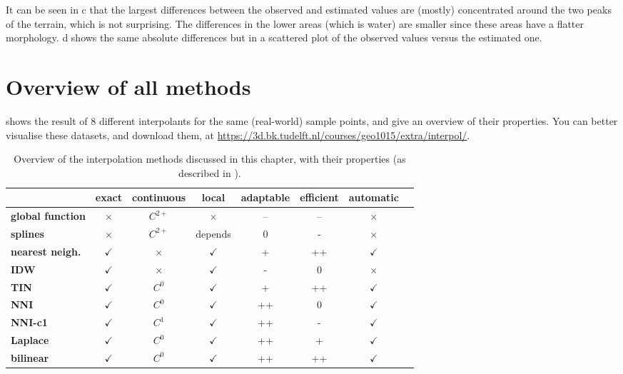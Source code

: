 It can be seen in c that the largest differences between the observed and estimated values are (mostly) concentrated around the two peaks of the terrain, which is not surprising.
The differences in the lower areas (which is water) are smaller since these areas have a flatter morphology.
d shows the same absolute differences but in a scattered plot of the observed values versus the estimated one.



%
\section{Overview of all methods}

 shows the result of 8 different interpolants for the same (real-world) sample points, and  give an overview of their properties.
You can better visualise these datasets, and download them, at \url{https://3d.bk.tudelft.nl/courses/geo1015/extra/interpol/}.

\begin{table}
\begin{tabular}{@{}lccccccl@{}}
\toprule
                         & exact         & continuous & local        & adaptable & efficient & automatic \\ \midrule
\textbf{global function} & $\times$      & $C^{2+}$   & $\times$     & --        & --        & $\times$     \\
\textbf{splines}         & $\times$      & $C^{2+}$   & depends      & 0         & -         & $\times$     \\ 
\textbf{nearest neigh.}  & $\checkmark$  & $\times$   & $\checkmark$ & +         & ++        & $\checkmark$ \\ 
\textbf{IDW}             & $\checkmark$  & $\times$   & $\checkmark$ & -         & 0         & $\times$     \\ 
\textbf{TIN}             & $\checkmark$  & $C^0$      & $\checkmark$ & +         & ++        & $\checkmark$ \\ 
\textbf{NNI}             & $\checkmark$  & $C^0$      & $\checkmark$ & ++        & 0         & $\checkmark$ \\ 
\textbf{NNI-c1}          & $\checkmark$  & $C^1$      & $\checkmark$ & ++        & -         & $\checkmark$ \\ 
\textbf{Laplace}         & $\checkmark$  & $C^0$      & $\checkmark$ & ++        & +         & $\checkmark$ \\ 
\textbf{bilinear}        & $\checkmark$  & $C^0$      & $\checkmark$ & ++        & ++        & $\checkmark$ \\ \bottomrule
\end{tabular}
\caption{Overview of the interpolation methods discussed in this chapter, with their properties (as described in ).}%
\label{tab:results_interpol}
\end{table}


